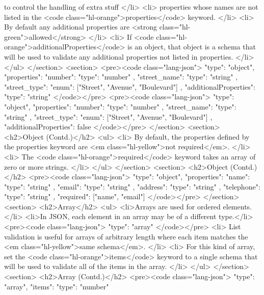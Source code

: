 \documentclass{efd-lecture}
\begin{document}
        to control the handling of extra stuff
      </li>
      <li>
        properties whose names are not listed in the
        <code class="hl-orange">properties</code> keyword.
      </li>
      <li>
        By default any additional properties are
        <strong class="hl-green">allowed</strong>
      </li>
      <li>
        If <code class="hl-orange">additionalProperties</code> is an object,
        that object is a schema that will be used to validate any additional
        properties not listed in properties.
      </li>
    </ul>
  </section>
  <section>
    <pre><code class="lang-json">
{
  "type": "object",
  "properties": {
    "number": { "type": "number" },
    "street_name": { "type": "string" },
    "street_type": { "enum": ["Street", "Avenue", "Boulevard"] }
  },
  "additionalProperties": { "type": "string" }
}
    </code></pre>
    <pre><code class="lang-json">
{
  "type": "object",
  "properties": {
    "number": { "type": "number" },
    "street_name": { "type": "string" },
    "street_type": { "enum": ["Street", "Avenue", "Boulevard"] }
  },
  "additionalProperties": false
}
    </code></pre>
  </section>
  <section>
    <h2>Object (Contd.)</h2>
    <ul>
      <li>
        By default, the properties defined by the properties keyword are
        <em class="hl-yellow">not required</em>.
      </li>
      <li>
        The <code class="hl-orange">required</code> keyword takes an array of
        zero or more strings.
      </li>
    </ul>
  </section>
  <section>
    <h2>Object (Contd.)</h2>
    <pre><code class="lang-json">
{
  "type": "object",
  "properties": {
    "name":      { "type": "string" },
    "email":     { "type": "string" },
    "address":   { "type": "string" },
    "telephone": { "type": "string" }
  },
  "required": ["name", "email"]
}
    </code></pre>
  </section>
  <section>
    <h2>Array</h2>
    <ul>
      <li>Arrays are used for ordered elements.</li>
      <li>In JSON, each element in an array may be of a different type.</li>
      <pre><code class="lang-json">
{ "type": "array" }
      </code></pre>
      <li>
        List validation is useful for arrays of arbitrary length where each item
        matches the <em class="hl-yellow">same schema</em>.
      </li>
      <li>
        For this kind of array, set the
        <code class="hl-orange">items</code> keyword to a single schema that
        will be used to validate all of the items in the array.
      </li>
    </ul>
  </section>
  <section>
    <h2>Array (Contd.)</h2>
    <pre><code class="lang-json">
{
  "type": "array",
  "items": {
    "type": "number"
  }
}
\end{document}
